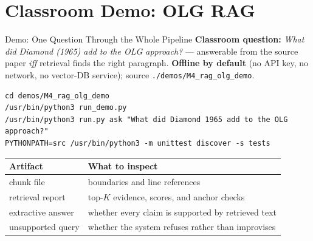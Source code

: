 \section{Classroom Demo: OLG RAG}

\begin{frame}[fragile]{Demo: One Question Through the Whole Pipeline}
\textbf{Classroom question:} \emph{What did Diamond (1965) add to the OLG approach?} --- answerable from the source paper \emph{iff} retrieval finds the right paragraph. \textbf{Offline by default} (no API key, no network, no vector-DB service); source \texttt{./demos/M4\_rag\_olg\_demo}.

\vspace{0.06cm}
\begin{center}
\end{center}

\vspace{0.05cm}
\begin{lstlisting}[basicstyle=\ttfamily\scriptsize, numbers=none]
cd demos/M4_rag_olg_demo
/usr/bin/python3 run_demo.py
/usr/bin/python3 run.py ask "What did Diamond 1965 add to the OLG approach?"
PYTHONPATH=src /usr/bin/python3 -m unittest discover -s tests
\end{lstlisting}

\vspace{0.05cm}
{\footnotesize
\begin{tabular}{@{}p{3.0cm}p{8.3cm}@{}}
\toprule
\textbf{Artifact} & \textbf{What to inspect} \\
\midrule
chunk file & boundaries and line references \\
retrieval report & top-$K$ evidence, scores, and anchor checks \\
extractive answer & whether every claim is supported by retrieved text \\
unsupported query & whether the system refuses rather than improvises \\
\bottomrule
\end{tabular}}


\end{frame}
